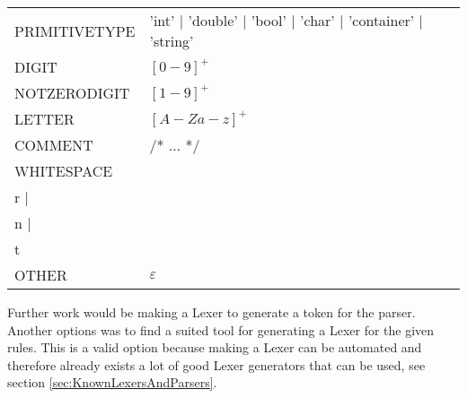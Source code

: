\begin{tabular}{l l}
PRIMITIVETYPE & 'int' | 'double' | 'bool' | 'char' | 'container' | 'string' \\
DIGIT & $[0-9]^+$ \\
NOTZERODIGIT & $ [1-9]^+$ \\
LETTER & $[A-Za-z]^+$\\
COMMENT & /* $\dots$ */ \\
WHITESPACE & \\r | \\n | \\t \\
OTHER & $\varepsilon$ \\
\end{tabular}

Further work would be making a Lexer to generate a token for the parser. Another options was to find a suited tool for generating a Lexer for the given rules. This is a valid option because making a Lexer can be automated and therefore already exists a lot of good Lexer generators that can be used, see section \ref{sec:KnownLexersAndParsers}.